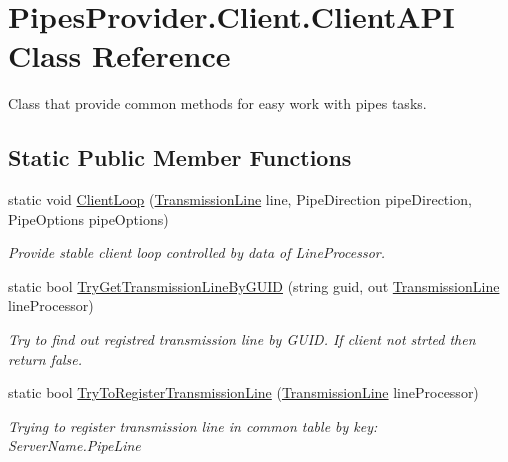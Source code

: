 \hypertarget{class_pipes_provider_1_1_client_1_1_client_a_p_i}{}\section{Pipes\+Provider.\+Client.\+Client\+A\+PI Class Reference}
\label{class_pipes_provider_1_1_client_1_1_client_a_p_i}


Class that provide common methods for easy work with pipes\textquotesingle{} tasks.  


\subsection*{Static Public Member Functions}
\begin{DoxyCompactItemize}
\item 
static void \mbox{\hyperlink{class_pipes_provider_1_1_client_1_1_client_a_p_i_a5faffad05ab5adb19a5691d41767ed4a}{Client\+Loop}} (\mbox{\hyperlink{class_pipes_provider_1_1_client_1_1_transmission_line}{Transmission\+Line}} line, Pipe\+Direction pipe\+Direction, Pipe\+Options pipe\+Options)
\begin{DoxyCompactList}\small\item\em Provide stable client loop controlled by data of Line\+Processor. \end{DoxyCompactList}\item 
static bool \mbox{\hyperlink{class_pipes_provider_1_1_client_1_1_client_a_p_i_a745ac6dce4a89785c4b9306af84871e7}{Try\+Get\+Transmission\+Line\+By\+G\+U\+ID}} (string guid, out \mbox{\hyperlink{class_pipes_provider_1_1_client_1_1_transmission_line}{Transmission\+Line}} line\+Processor)
\begin{DoxyCompactList}\small\item\em Try to find out registred transmission line by G\+U\+ID. If client not strted then return false. \end{DoxyCompactList}\item 
static bool \mbox{\hyperlink{class_pipes_provider_1_1_client_1_1_client_a_p_i_a70ffe69963e762ee828887856e119883}{Try\+To\+Register\+Transmission\+Line}} (\mbox{\hyperlink{class_pipes_provider_1_1_client_1_1_transmission_line}{Transmission\+Line}} line\+Processor)
\begin{DoxyCompactList}\small\item\em Trying to register transmission line in common table by key\+: Server\+Name.\+Pipe\+Line \end{DoxyCompactList}\item 

\end{DoxyCompactItemize}
